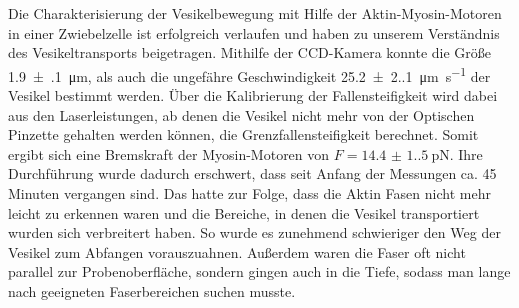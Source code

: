 Die Charakterisierung der Vesikelbewegung mit Hilfe der Aktin-Myosin-Motoren in einer Zwiebelzelle ist erfolgreich verlaufen und haben zu unserem Verständnis des Vesikeltransports beigetragen.
Mithilfe der CCD-Kamera konnte die Größe \qty{1.9(1)}{\um}, als auch die ungefähre Geschwindigkeit \qty{25.2(2.1)}{\um \per \second} der Vesikel bestimmt werden.
Über die Kalibrierung der Fallensteifigkeit wird dabei aus den Laserleistungen, ab denen die Vesikel nicht mehr von der Optischen Pinzette gehalten werden können, die Grenzfallensteifigkeit berechnet.
Somit ergibt sich eine Bremskraft der Myosin-Motoren von $F = \qty{14.4(1.5)}{\pico\newton}$.
Ihre Durchführung wurde dadurch erschwert, dass seit Anfang der Messungen ca. 45 Minuten vergangen sind.
Das hatte zur Folge, dass die Aktin Fasen nicht mehr leicht zu erkennen waren und die Bereiche, in denen die Vesikel transportiert wurden sich verbreitert haben.
So wurde es zunehmend schwieriger den Weg der Vesikel zum Abfangen vorauszuahnen.
Außerdem waren die Faser oft nicht parallel zur Probenoberfläche, sondern gingen auch in die Tiefe, sodass man lange nach geeigneten Faserbereichen suchen musste.
